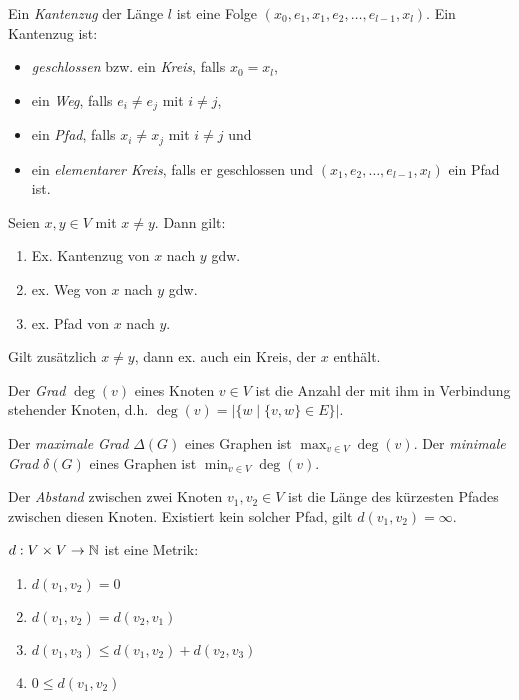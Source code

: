 \begin{definition}
    Ein \textit{Kantenzug} der Länge $ l $ ist eine Folge $ (x_0, e_1, x_1, e_2, \dots, e_{l - 1}, x_l) $.
    Ein Kantenzug ist:
    \begin{itemize}
        \item \textit{geschlossen} bzw. ein \textit{Kreis}, falls $ x_0 = x_l $,
        \item ein \textit{Weg}, falls $ e_i \ne e_j $ mit $ i \ne j $,
        \item ein \textit{Pfad}, falls $ x_i \ne x_j $ mit $ i \ne j $ und
        \item ein \textit{elementarer Kreis}, falls er geschlossen und $ (x_1, e_2, \dots, e_{l - 1}, x_l) $ ein Pfad ist.
    \end{itemize}
\end{definition}

\begin{lemma}
    Seien $ x, y \in V $ mit $ x \ne y $.
    Dann gilt:
    \begin{enumerate}
        \item Ex. Kantenzug von $ x $ nach $ y $ gdw.
        \item ex. Weg von $ x $ nach $ y $ gdw.
        \item ex. Pfad von $ x $ nach $ y $.
    \end{enumerate}

    Gilt zusätzlich $ x \ne y $, dann ex. auch ein Kreis, der $ x $ enthält.
\end{lemma}

\begin{definition}[Grad]
    Der \textit{Grad} $ \deg(v) $ eines Knoten $ v \in V $ ist die Anzahl der mit ihm in Verbindung stehender Knoten, d.h. $ \deg(v) = |\{ w \mid \{ v, w \} \in E \}| $.

    Der \textit{maximale Grad} $ \Delta(G) $ eines Graphen ist $ \max_{v \in V} \deg(v) $.
    Der \textit{minimale Grad} $ \delta(G) $ eines Graphen ist $ \min_{v \in V} \deg(v) $.
\end{definition}

\begin{definition}[Abstand]
    Der \textit{Abstand} zwischen zwei Knoten $ v_1, v_2 \in V $ ist die Länge des kürzesten Pfades zwischen diesen Knoten.
    Existiert kein solcher Pfad, gilt $ d(v_1, v_2) = \infty $.
\end{definition}

\begin{observation}
    $ d : V \times V \rightarrow \mathbb{N} $ ist eine Metrik:
    \begin{enumerate}
        \item $ d(v_1, v_2) = 0 $
        \item $ d(v_1, v_2) = d(v_2, v_1) $
        \item $ d(v_1, v_3) \leq d(v_1, v_2) + d(v_2, v_3) $
        \item $ 0 \leq d(v_1, v_2) $
    \end{enumerate}
\end{observation}

